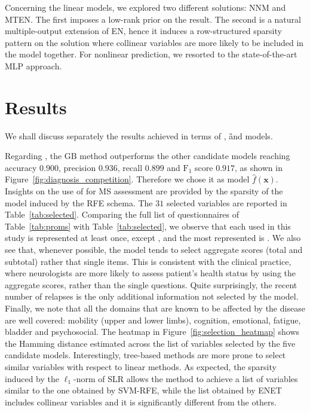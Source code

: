 Concerning the linear models, we explored two different solutions: NNM and MTEN. The first imposes a low-rank prior on the result. The second is a natural multiple-output extension of EN, hence it induces a row-structured sparsity pattern on the solution where collinear variables are more likely to be included in the model together. For nonlinear prediction, we resorted to the state-of-the-art MLP approach.

\section{Results}\label{sec:aism_results}

We shall discuss separately the results achieved in terms of \F, \G and \FOG models.

Regarding \F, the GB method outperforms the other candidate models reaching accuracy $0.900$, precision $0.936$, recall $0.899$ and $\text{F}_1$ score $0.917$, as shown in Figure~\ref{fig:diagnosis_competition}. Therefore we chose it as \F model $\hat{f}(\bm{x})$.
Insights on the use of \PCOs for MS assessment are provided by the sparsity of the \F model induced by the RFE schema.
The $31$ selected variables are reported in Table~\ref{tab:selected}.
Comparing the full list of \PCO questionnaires of Table~\ref{tab:proms} with Table~\ref{tab:selected}, we observe that each \PCO used in this study is represented at least once, except \EDINB, and the most represented is \FIM.
We also see that, whenever possible, the model tends to select aggregate scores (total and subtotal) rather that single items. This is consistent with the clinical practice, where neurologists are more likely to assess patient's health status by using the aggregate scores, rather than the single questions.
Quite surprisingly, the recent number of relapses is the only additional information not selected by the model.
Finally, we note that all the domains that are known to be affected by the disease are well covered: mobility (upper and lower limbs), cognition, emotional, fatigue, bladder and psychosocial.
The heatmap in Figure~\ref{fig:selection_heatmap} shows the Hamming distance estimated across the list of variables selected by the five \F candidate models. Interestingly, tree-based methods are more prone to select similar variables with respect to linear methods. As expected, the sparsity induced by the $\ell_1$-norm of SLR allows the method to achieve a list of variables similar to the one obtained by SVM-RFE, while the list obtained by ENET includes collinear variables and it is significantly different from the others.

